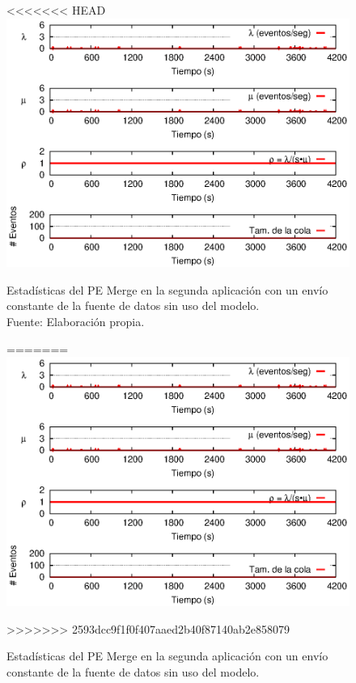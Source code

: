 \begin{figure}[!ht]
<<<<<<< HEAD
    \centering
    \captionsetup{justification=centering}
    \includegraphics[scale=1]{images/exp/app2/uniform/sm/statusMergePE.eps}
    \caption[Estadísticas del PE Merge en la segunda aplicación con un envío constante de la fuente de datos sin uso del modelo.]{Estadísticas del PE Merge en la segunda aplicación con un envío constante de la fuente de datos sin uso del modelo.\\Fuente: Elaboración propia.}
=======
\centering
    \includegraphics[scale=1.1]{images/exp/app2/uniform/sm/statusMergePE.eps}
    \caption{Estad\'isticas del PE Merge en la segunda aplicaci\'on con un env\'io constante de la fuente de datos sin uso del modelo.}
>>>>>>> 2593dcc9f1f0f407aaed2b40f87140ab2e858079
    \label{fig:app2-uniform-statusMergePE-sm}
\end{figure}

